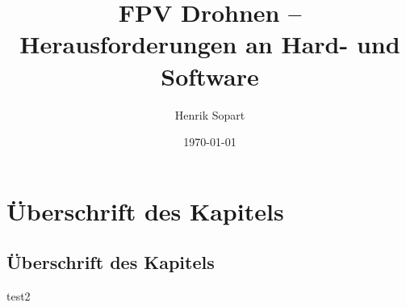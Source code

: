 \documentclass[a4paper,11pt]{scrartcl}
\title{FPV Drohnen – Herausforderungen an Hard- und Software}
\author{Henrik Sopart}
\date{\today}
\begin{document}
\maketitle
\newpage
\tableofcontents
\newpage
\section[Überschrift für das Inhaltsverzeichnis]{Überschrift des Kapitels}
\subsection[Überschrift für das Inhaltsverzeichnis]{Überschrift des Kapitels}

test2
\end{document}
